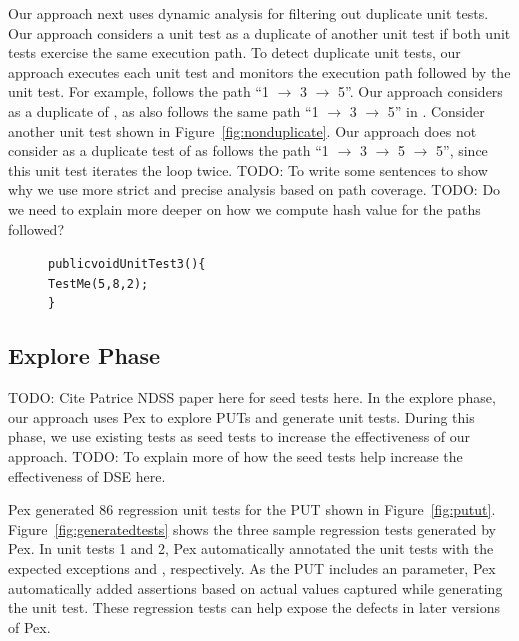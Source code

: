 Our approach next uses dynamic analysis for filtering out duplicate unit tests.
Our approach considers a unit test as a duplicate of another unit test if both
unit tests exercise the same execution path. To detect duplicate unit tests,
our approach executes each unit test and monitors the execution path followed
by the unit test. For example,  follows the path ``1 $\rightarrow$ 3 $\rightarrow$ 5''.
Our approach considers  as a duplicate of , as 
also follows the same path ``1 $\rightarrow$ 3 $\rightarrow$ 5'' in . 
Consider another unit test  shown in Figure~\ref{fig:nonduplicate}.
Our approach does not consider  as a duplicate test of 
as  follows the path ``1 $\rightarrow$ 3 $\rightarrow$ 5 $\rightarrow$ 5'',
since this unit test iterates the loop twice. TODO: To write some sentences
to show why we use more strict and precise analysis based on path coverage.
TODO: Do we need to explain more deeper on how we compute hash value for the
paths followed?

\begin{figure}[t]
\begin{CodeOut}
\begin{alltt}
public void UnitTest3() \{
\hspace*{0.5in}TestMe(5, 8, 2);
\}
\end{alltt}
\end{CodeOut}\vspace*{-3ex}
\vspace*{-3ex}
\end{figure}

\subsection{Explore Phase}
\label{sec:explore}

TODO: Cite Patrice NDSS paper here for seed tests here.
In the explore phase, our approach uses Pex to explore PUTs and generate unit
tests. During this phase, we use existing tests as seed tests to increase the effectiveness
of our approach. TODO: To explain more of how the seed tests help increase the effectiveness of
DSE here. 

Pex generated $86$ regression unit tests for the PUT shown in Figure~\ref{fig:putut}. 
Figure~\ref{fig:generatedtests} shows the three sample regression tests generated by Pex.
In unit tests 1 and 2, Pex automatically annotated the unit tests with the expected exceptions
 and , respectively.
As the PUT includes an  parameter, Pex automatically added assertions
based on actual values captured while generating the unit test. These regression tests
can help expose the defects in later versions of Pex.

